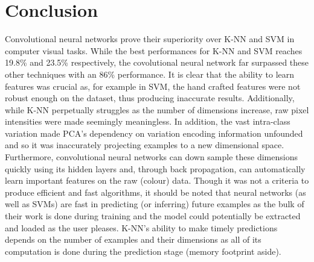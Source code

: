 \documentclass{article} %
\begin{document}
\section{Conclusion}
Convolutional neural networks prove their superiority over K-NN and SVM in computer visual tasks. While the best performances for K-NN and SVM reaches 19.8\% and 23.5\% respectively, the covolutional neural network far surpassed these other techniques with an 86\% performance. It is clear that the ability to learn features was crucial as, for example in SVM, the hand crafted features were not robust enough on the dataset, thus producing inaccurate results. Additionally, while K-NN perpetually struggles as the number of dimensions increase, raw pixel intensities were made seemingly meaningless. In addition, the vast intra-class variation made PCA's dependency on variation encoding information unfounded and so it was inaccurately projecting examples to a new dimensional space. Furthermore, convolutional neural networks can down sample these dimensions quickly using its hidden layers and, through back propagation, can automatically learn important features on the raw (colour) data. Though it was not a criteria to produce efficient and fast algorithms, it should be noted that neural networks (as well as SVMs) are fast in predicting (or inferring) future examples as the bulk of their work is done during training and the model could potentially be extracted and loaded as the user pleases. K-NN's ability to make timely predictions depends on the number of examples and their dimensions as all of its computation is done during the prediction stage (memory footprint aside).

\small{
\nocite{*}


}
\end{document}
